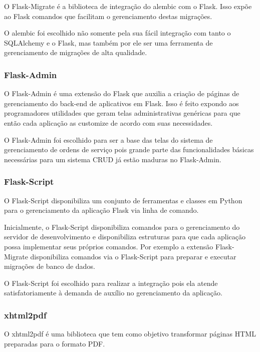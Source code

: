 \documentclass[
	article,			%
	11pt,				%
	oneside,			%
	a4paper,			%
	english,			%
	brazil,				%
	sumario=tradicional
	]{abntex2}
\begin{document}
O Flask-Migrate é a biblioteca de integração do alembic com o Flask.
Isso expõe ao Flask comandos que facilitam o gerenciamento destas migrações. \cite{flaskmigrate}

O alembic foi escolhido não somente pela sua fácil integração com tanto o SQLAlchemy e o Flask, mas também por ele ser uma ferramenta de gerenciamento de migrações de alta qualidade.

\subsubsection{Flask-Admin}

O Flask-Admin é uma extensão do Flask que auxilia a criação de páginas de gerenciamento do back-end de aplicativos em Flask.
Isso é feito expondo aos programadores utilidades que geram telas administrativas genéricas para que então cada aplicação as customize de acordo com suas necessidades. \cite{flaskadmin}

O Flask-Admin foi escolhido para ser a base das telas do sistema de gerenciamento de ordens de serviço pois grande parte das funcionalidades básicas necessárias para um sistema CRUD já estão maduras no Flask-Admin.

\subsubsection{Flask-Script}

O Flask-Script disponibiliza um conjunto de ferramentas e classes em Python para o gerenciamento da aplicação Flask via linha de comando.

Inicialmente, o Flask-Script disponibiliza comandos para o gerenciamento do servidor de desenvolvimento e disponibiliza estruturas para que cada aplicação possa implementar seus próprios comandos. \cite{flaskscript}
Por exemplo a extensão Flask-Migrate disponibiliza comandos via o Flask-Script para preparar e executar migrações de banco de dados.

O Flask-Script foi escolhido para realizar a integração pois ela atende satisfatoriamente à demanda de auxílio no gerenciamento da aplicação.

\subsubsection{xhtml2pdf}

O xhtml2pdf é uma biblioteca que tem como objetivo transformar páginas HTML preparadas para o formato PDF.\cite{xhtml2pdf}
\end{document}
